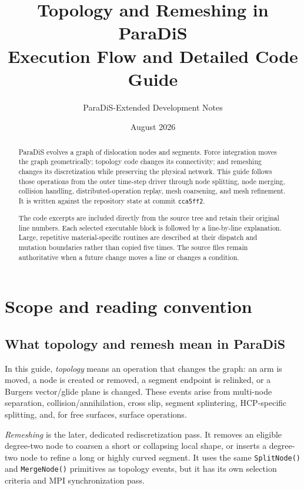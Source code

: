 \documentclass[11pt]{article}
\title{Topology and Remeshing in ParaDiS\\
       \large Execution Flow and Detailed Code Guide}
\author{ParaDiS-Extended Development Notes}
\date{August 2026}
\newcommand{\code}[1]{\texorpdfstring{\nolinkurl{#1}}{#1}}
\begin{document}
\maketitle

\begin{abstract}
ParaDiS evolves a graph of dislocation nodes and segments. Force integration
moves the graph geometrically; topology code changes its connectivity; and
remeshing changes its discretization while preserving the physical network.
This guide follows those operations from the outer time-step driver through
node splitting, node merging, collision handling, distributed-operation
replay, mesh coarsening, and mesh refinement. It is written against the
repository state at commit \code{cca5ff2}.

The code excerpts are included directly from the source tree and retain their
original line numbers. Each selected executable block is followed by a
line-by-line explanation. Large, repetitive material-specific routines are
described at their dispatch and mutation boundaries rather than copied five
times. The source files remain authoritative when a future change moves a
line or changes a condition.
\end{abstract}

\tableofcontents
\newpage

\section{Scope and reading convention}

\subsection{What topology and remesh mean in ParaDiS}

In this guide, \emph{topology} means an operation that changes the graph: an
arm is moved, a node is created or removed, a segment endpoint is relinked,
or a Burgers vector/glide plane is changed. These events arise from multi-node
separation, collision/annihilation, cross slip, segment splintering,
HCP-specific splitting, and, for free surfaces, surface operations.

\emph{Remeshing} is the later, dedicated rediscretization pass. It removes an
eligible degree-two node to coarsen a short or collapsing local shape, or
inserts a degree-two node to refine a long or highly curved segment. It uses
the same \code{SplitNode()} and \code{MergeNode()} primitives as topology
events, but it has its own selection criteria and MPI synchronization pass.
\end{document}
